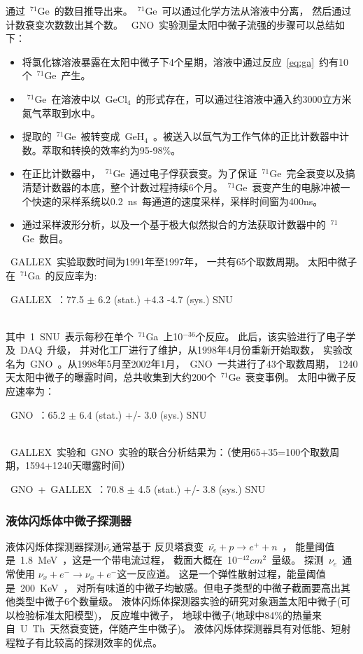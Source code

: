 通过~$^{71}$Ge~的数目推导出来。~$^{71}$Ge~可以通过化学方法从溶液中分离，
然后通过计数衰变次数数出其个数\citep{bahcall1997gallium}。
~GNO~实验测量太阳中微子流强的步骤可以总结如下：
\begin{itemize}
\item 将氯化镓溶液暴露在太阳中微子下4个星期，溶液中通过反应~\ref{eq:ga}~约有10个~$^{71}$Ge~产生。
\item ~$^{71}$Ge~在溶液中以~GeCl$_4$~的形式存在，可以通过往溶液中通入约3000立方米氮气萃取到水中\citep{henrich1997angew}。
\item 提取的~$^{71}$Ge~被转变成~GeH$_4$~。被送入以氙气为工作气体的正比计数器中计数。萃取和转换的效率约为95-98\%\citep{wink1993miniaturized}。
\item 在正比计数器中，~$^{71}$Ge~通过电子俘获衰变。为了保证~$^{71}$Ge~完全衰变以及搞清楚计数器的本底，整个计数过程持续6个月。~$^{71}$Ge~衰变产生的电脉冲被一个快速的采样系统以0.2~ns~每通道的速度采样，采样时间窗为400ns。
\item 通过采样波形分析，以及一个基于极大似然拟合的方法获取计数器中的~$^{71}$Ge~数目。
\end{itemize}
~GALLEX~实验取数时间为1991年至1997年，
一共有65个取数周期。
太阳中微子在~$^{71}$Ga~的反应率为:\\
\centerline{~GALLEX~：77.5 $\pm$ 6.2 (stat.) +4.3 -4.7 (sys.) SNU \citep{hampel1999gallex}}\\
其中~1~SNU~表示每秒在单个~$^{71}$Ga~上10$^{-36}$个反应。
此后，该实验进行了电子学及~DAQ~升级，
并对化工厂进行了维护，从1998年4月份重新开始取数，
实验改名为~GNO~。从1998年5月至2002年1月，~GNO~一共进行了43个取数周期，
1240天太阳中微子的曝露时间，总共收集到大约200个~$^{71}$Ge~衰变事例。
太阳中微子反应速率为：\\
 \centerline{~GNO~：65.2 $\pm$ 6.4 (stat.) +/- 3.0  (sys.) SNU \citep{kirsten2002talk}}\\
~GALLEX~实验和~GNO~实验的联合分析结果为：（使用65+35=100个取数周期，1594+1240天曝露时间）\\
   \centerline{~GNO~+~GALLEX~：70.8 $\pm$ 4.5 (stat.) +/- 3.8 (sys.) SNU  \citep{kirsten2002talk}}
\subsubsection{液体闪烁体中微子探测器}
液体闪烁体探测器探测$\bar{\nu_e}$通常基于
反贝塔衰变~$\bar{\nu_e} + p \rightarrow e^+ + n $~，
能量阈值是~1.8~MeV~，这是一个带电流过程，
截面大概在~10$^{-42}cm^2$~量级。
探测~$\nu_e$~通常使用
$\nu_x +e ^- \rightarrow \nu_x +e ^-$这一反应道。
这是一个弹性散射过程，能量阈值是~200~KeV~，
对所有味道的中微子均敏感。但电子类型的中微子截面要高出其他类型中微子6个数量级。
液体闪烁体探测器实验的研究对象涵盖太阳中微子(可以检验标准太阳模型)，
反应堆中微子，
地球中微子(地球中84\%的热量来自~U~Th~天然衰变链，伴随产生中微子)。
液体闪烁体探测器具有对低能、短射程粒子有比较高的探测效率的优点\citep{gibson1971liquid}。

